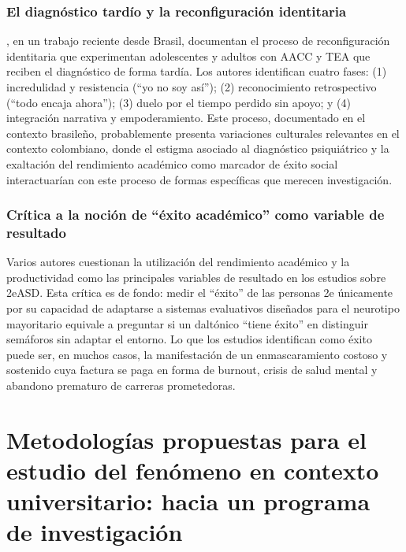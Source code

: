 \subsubsection{El diagnóstico tardío y la reconfiguración identitaria}

\textcite{pessoa2026}, en un trabajo reciente desde Brasil, documentan el proceso
de reconfiguración identitaria que experimentan adolescentes y adultos con AACC
y TEA que reciben el diagnóstico de forma tardía. Los autores identifican cuatro
fases: (1) incredulidad y resistencia (``yo no soy así''); (2) reconocimiento
retrospectivo (``todo encaja ahora''); (3) duelo por el tiempo perdido sin apoyo;
y (4) integración narrativa y empoderamiento. Este proceso, documentado en el
contexto brasileño, probablemente presenta variaciones culturales relevantes
en el contexto colombiano, donde el estigma asociado al diagnóstico psiquiátrico
y la exaltación del rendimiento académico como marcador de éxito social
interactuarían con este proceso de formas específicas que merecen investigación.

\subsubsection{Crítica a la noción de ``éxito académico'' como variable de resultado}

Varios autores \parencite{macleod2017, gillespie-lynch2017, wallpolin2017}
cuestionan la utilización del rendimiento académico y la productividad
como las principales variables de resultado en los estudios sobre 2eASD.
Esta crítica es de fondo: medir el ``éxito'' de las personas 2e únicamente
por su capacidad de adaptarse a sistemas evaluativos diseñados para el
neurotipo mayoritario equivale a preguntar si un daltónico ``tiene éxito''
en distinguir semáforos sin adaptar el entorno. Lo que los estudios
identifican como éxito puede ser, en muchos casos, la manifestación de un
enmascaramiento costoso y sostenido cuya factura se paga en forma de
burnout, crisis de salud mental y abandono prematuro de carreras
prometedoras.

\section{Metodologías propuestas para el estudio del fenómeno en contexto
         universitario: hacia un programa de investigación}
\label{sec:metodologias}

